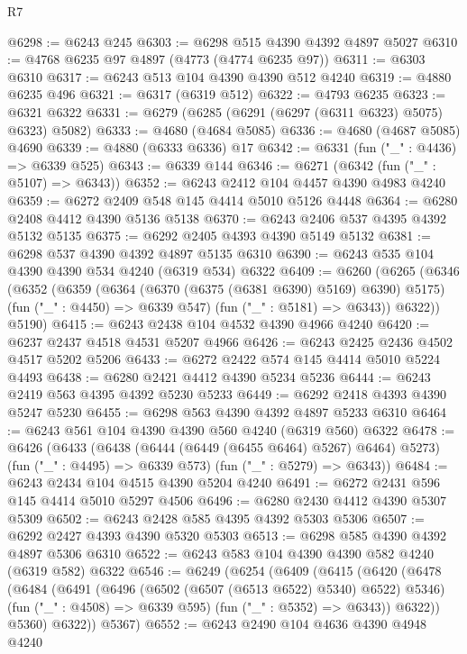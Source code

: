 \begin{lexlean}{R7}
\begin{coremodule}
@6298 := @6243 @245
@6303 := @6298 @515 @4390 @4392 @4897 @5027
@6310 := @4768 @6235 @97 @4897 (@4773 (@4774 @6235 @97))
@6311 := @6303 @6310
@6317 := @6243 @513 @104 @4390 @4390 @512 @4240
@6319 := @4880 @6235 @496
@6321 := @6317 (@6319 @512)
@6322 := @4793 @6235
@6323 := @6321 @6322
@6331 := @6279 (@6285 (@6291 (@6297 (@6311 @6323) @5075) @6323) @5082)
@6333 := @4680 (@4684 @5085)
@6336 := @4680 (@4687 @5085) @4690
@6339 := @4880 (@6333 @6336) @17
@6342 := @6331 (fun ("_" : @4436) => @6339 @525)
@6343 := @6339 @144
@6346 := @6271 (@6342 (fun ("_" : @5107) => @6343))
@6352 := @6243 @2412 @104 @4457 @4390 @4983 @4240
@6359 := @6272 @2409 @548 @145 @4414 @5010 @5126 @4448
@6364 := @6280 @2408 @4412 @4390 @5136 @5138
@6370 := @6243 @2406 @537 @4395 @4392 @5132 @5135
@6375 := @6292 @2405 @4393 @4390 @5149 @5132
@6381 := @6298 @537 @4390 @4392 @4897 @5135 @6310
@6390 := @6243 @535 @104 @4390 @4390 @534 @4240 (@6319 @534) @6322
@6409 := @6260
    (@6265
      (@6346
        (@6352
          (@6359
            (@6364 (@6370 (@6375 (@6381 @6390) @5169) @6390) @5175)
            (fun ("_" : @4450) => @6339 @547)
            (fun ("_" : @5181) => @6343))
          @6322))
      @5190)
@6415 := @6243 @2438 @104 @4532 @4390 @4966 @4240
@6420 := @6237 @2437 @4518 @4531 @5207 @4966
@6426 := @6243 @2425 @2436 @4502 @4517 @5202 @5206
@6433 := @6272 @2422 @574 @145 @4414 @5010 @5224 @4493
@6438 := @6280 @2421 @4412 @4390 @5234 @5236
@6444 := @6243 @2419 @563 @4395 @4392 @5230 @5233
@6449 := @6292 @2418 @4393 @4390 @5247 @5230
@6455 := @6298 @563 @4390 @4392 @4897 @5233 @6310
@6464 := @6243 @561 @104 @4390 @4390 @560 @4240 (@6319 @560) @6322
@6478 := @6426
    (@6433
      (@6438 (@6444 (@6449 (@6455 @6464) @5267) @6464) @5273)
      (fun ("_" : @4495) => @6339 @573)
      (fun ("_" : @5279) => @6343))
@6484 := @6243 @2434 @104 @4515 @4390 @5204 @4240
@6491 := @6272 @2431 @596 @145 @4414 @5010 @5297 @4506
@6496 := @6280 @2430 @4412 @4390 @5307 @5309
@6502 := @6243 @2428 @585 @4395 @4392 @5303 @5306
@6507 := @6292 @2427 @4393 @4390 @5320 @5303
@6513 := @6298 @585 @4390 @4392 @4897 @5306 @6310
@6522 := @6243 @583 @104 @4390 @4390 @582 @4240 (@6319 @582) @6322
@6546 := @6249
    (@6254
      (@6409
        (@6415
          (@6420
            (@6478
              (@6484
                (@6491
                  (@6496 (@6502 (@6507 (@6513 @6522) @5340) @6522) @5346)
                  (fun ("_" : @4508) => @6339 @595)
                  (fun ("_" : @5352) => @6343))
                @6322))
            @5360)
          @6322))
      @5367)
@6552 := @6243 @2490 @104 @4636 @4390 @4948 @4240

\end{coremodule}
\end{lexlean}

